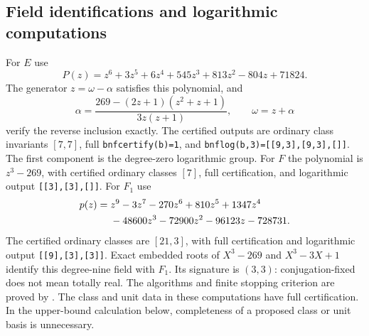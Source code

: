 \documentclass[11pt]{article}
\theoremstyle{remark}\newtheorem{remark}[theorem]{Remark}
\begin{document}
\subsection{Field identifications and logarithmic computations}
For $E$ use
\begin{equation}
 P(z)=z^6+3z^5+6z^4+545z^3+813z^2-804z+71824.
 \label{eq:polyE}
\end{equation}
The generator $z=\omega-\alpha$ satisfies this polynomial, and
\[
 \alpha=\frac{269-(2z+1)(z^2+z+1)}{3z(z+1)},\qquad\omega=z+\alpha
\]
verify the reverse inclusion exactly.
The certified outputs are ordinary class invariants $[7,7]$, full \texttt{bnfcertify(b)=1}, and
\texttt{bnflog(b,3)=[[9,3],[9,3],[]]}.
The first component is the degree-zero logarithmic group.
For $F$ the polynomial is $z^3-269$, with certified ordinary classes $[7]$, full certification, and logarithmic output \texttt{[[3],[3],[]]}.
For $F_1$ use
\begin{align}
 p(z)={}&z^9-3z^7-270z^6+810z^5+1347z^4\notag\\
 &-48600z^3-72900z^2-96123z-728731.
 \label{eq:polyF1}
\end{align}
The certified ordinary classes are $[21,3]$, with full certification and logarithmic output \texttt{[[9],[3],[3]]}.
Exact embedded roots of $X^3-269$ and $X^3-3X+1$ identify this degree-nine field with $F_1$.
Its signature is $(3,3)$: conjugation-fixed does not mean totally real.
The algorithms and finite stopping criterion are proved by \citet[Sections 2--4, especially Lemma 3.8]{BelabasJaulent2016}.
The class and unit data in these computations have full certification. In the upper-bound calculation below, completeness of a proposed class or unit basis is unnecessary.
\end{document}
